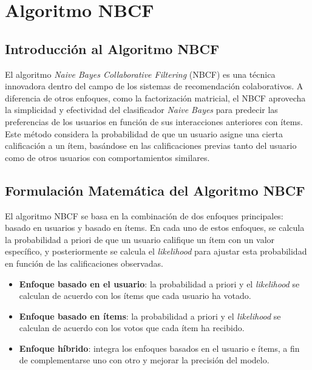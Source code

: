 \documentclass[twocolumn, fontsize=10pt]{article}
\begin{document}
\section{Algoritmo NBCF}

\subsection{Introducción al Algoritmo NBCF}

El algoritmo \textit{Naive Bayes Collaborative 
Filtering} (NBCF) es una técnica innovadora dentro 
del campo de los sistemas de recomendación 
colaborativos. A diferencia de otros enfoques, 
como la factorización matricial, el NBCF aprovecha la 
simplicidad y efectividad del clasificador \textit{Naive Bayes} 
para predecir las preferencias de los usuarios en 
función de sus interacciones anteriores con ítems. 
Este método considera la probabilidad de que un 
usuario asigne una cierta calificación a un ítem, 
basándose en las calificaciones previas tanto del 
usuario como de otros usuarios con comportamientos 
similares.

\subsection{Formulación Matemática del Algoritmo NBCF}

El algoritmo NBCF se basa en la combinación de dos 
enfoques principales: basado en usuarios y basado 
en ítems. En cada uno de estos enfoques, se calcula la 
probabilidad a priori de que un usuario califique un 
ítem con un valor específico, y posteriormente se 
calcula el \textit{likelihood} para ajustar esta 
probabilidad en función de las calificaciones 
observadas.

\begin{itemize}
    \item \textbf{Enfoque basado en el usuario}:
    la probabilidad a priori y el \textit{likelihood} se
    calculan de acuerdo con los ítems que cada usuario ha votado. \cite{tesis_sistema_recomendador_hibrido}
    \item \textbf{Enfoque basado en ítems}:
    la probabilidad a priori y el \textit{likelihood} se calculan
    de acuerdo con los votos que cada ítem ha recibido. \cite{tesis_sistema_recomendador_hibrido}
    \item \textbf{Enfoque híbrido}:
    integra los enfoques basados en el usuario e ítems, a fin
    de complementarse uno con otro y mejorar la precisión del modelo. \cite{tesis_sistema_recomendador_hibrido}

\end{itemize}
\end{document}
